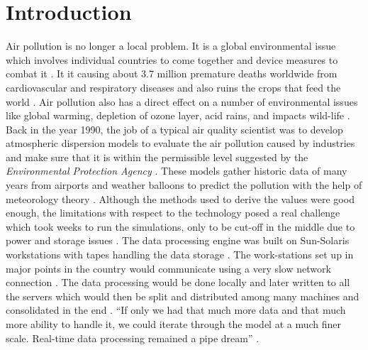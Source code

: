 \documentclass[sigconf]{acmart}
\begin{document}
\section{Introduction}
Air pollution is no longer a local problem. It is a global environmental issue which involves individual countries to come together and device measures to combat it \cite{www-ral}. It it causing about 3.7 million premature deaths worldwide from cardiovascular and respiratory diseases and also ruins the crops that feed the world \cite{www-ral}. Air pollution also has a direct effect on a number of environmental issues like global warming, depletion of ozone layer, acid rains, and impacts wild-life \cite{www-ral}. \\
Back in the year 1990, the job of a typical air quality scientist was to develop atmospheric dispersion models to evaluate the air pollution caused by industries and make sure that it is within the permissible level suggested by the {\em Environmental Protection Agency} \cite{www-ibm1}. These models gather historic data of many years from airports and weather balloons to predict the pollution with the help of meteorology theory \cite{www-ibm1}. Although the methods used to derive the values were good enough, the limitations with respect to the technology posed a real challenge which took weeks to run the simulations, only to be cut-off in the middle due to power and storage issues \cite{www-ibm1}. The data processing engine was built on Sun-Solaris workstations with tapes handling the data storage \cite{www-ibm1}. The work-stations set up in major points in the country would communicate using a very slow network connection \cite{www-ibm1}. The data processing would be done locally and later written to all the servers which would then be split and distributed among many machines and consolidated in the end \cite{www-ibm1}. ``If only we had that much more data and that much more ability to handle it, we could iterate through the model at a much finer scale. Real-time data processing remained a pipe dream'' \cite{www-ibm1}. \\
\end{document}
